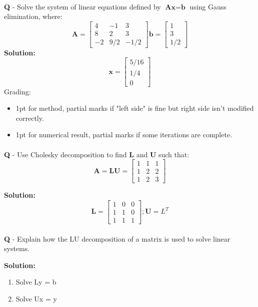 \documentclass{llncs}
\newcounter{ques}
\newcommand{\myspace}[0]{\vspace*{0.25cm}}
\renewcommand{\question}[1]{\paragraph{}\textbf{Q\theques} - #1\stepcounter{ques} }
\newcommand{\answer}[1]{\color{red}\textbf{Solution:}\\#1\color{black}}
\begin{document}
\myspace

\myspace

\hrulefill

\newpage
\question{Solve the system of linear equations defined by $\textbf{Ax}=\textbf{b}$ using Gauss elimination, where:
$$
\textbf{A}=
\begin{bmatrix}
4 & -1 & 3 \\
8 & 2 & 3 \\
-2 & 9/2 & -1/2
\end{bmatrix}
\textbf{b} = \begin{bmatrix}
1 \\
3 \\
1/2
\end{bmatrix}
$$
}
\answer{
$$
\textbf{x}=
\begin{bmatrix}
5/16 \\
1/4 \\
0
\end{bmatrix}
$$
Grading:
\begin{itemize}
\item 1pt for method, partial marks if "left side" is fine but right side isn't modified correctly.
\item 1pt for numerical result, partial marks if some iterations are complete.
\end{itemize}
}

\newpage

\question{Use Cholesky decomposition to find \textbf{L} and \textbf{U} such that: 
$$
\textbf{A}=\textbf{LU} =
\begin{bmatrix}
1 & 1 & 1 \\
1 & 2 & 2 \\
1 & 2 & 3
\end{bmatrix}
$$
}

\answer{
$$
\textbf{L}=
\begin{bmatrix}
1 & 0 & 0 \\
1 & 1 & 0 \\
1 & 1 & 1
\end{bmatrix}
;
\textbf{U}=L^{T}
$$
}

\newpage
\question{Explain how the LU decomposition of a matrix is used to solve linear systems.}

\answer{
\begin{enumerate}
\item Solve Ly = b
\item Solve Ux = y 
\end{enumerate}
}


\newpage
\end{document}
